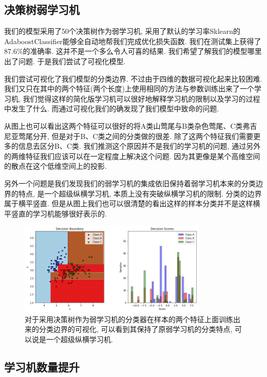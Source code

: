 \documentclass[lang=cn,11pt]{elegantpaper}
\begin{document}
\subsection{决策树弱学习机}

我们的模型采用了50个决策树作为弱学习机, 采用了默认的学习率Sklearn的AdaboostClassifier能够全自动地帮我们完成优化损失函数. 我们在测试集上获得了87.6\%的准确率. 这并不是一个多么令人可喜的结果. 我们希望了解我们的模型哪里出了问题. 于是我们尝试了可视化模型.

我们尝试可视化了我们模型的分类边界. 不过由于四维的数据可视化起来比较困难. 我们又只在其中的两个特征(两个长度)上使用相同的方法与参数训练出来了一个学习机, 我们觉得这样的简化版学习机可以很好地解释学习机的限制以及学习的过程中发生了什么. 而通过可视化我们的确发现了我们模型中致命的问题.

从图上也可以看出这两个特征可以很好的将A类山莺尾与B类杂色莺尾、C类弗吉尼亚莺尾分开, 但是对于B、C类之间的分类做的很差. 除了这两个特征我们需要更多的信息去区分B、C类. 我们推测这个原因并不是我们的学习机的问题, 通过另外的两维特征我们应该可以在一定程度上解决这个问题. 因为其更像是某个高维空间的散点在这个低维空间上的投影.

另外一个问题是我们发现我们的弱学习机的集成依旧保持着弱学习机本来的分类边界的特点, 是一个超级纵横学习机, 本质上没有突破纵横学习机的限制. 分类的边界属于横平竖直. 但是从图上我们也可以很清楚的看出这样的样本分类并不是这样横平竖直的学习机能够很好表示的.

\begin{figure}[hbt]
\centering
  \includegraphics[width=0.8\textwidth]{ada_tree}
  \caption{对于采用决策树作为弱学习机的分类器在样本的两个特征上面训练出来的分类边界的可视化, 可以看到其保持了原弱学习机的分类特点, 可以说是一个超级纵横学习机.}
\end{figure}



\subsection{学习机数量提升}
\end{document}

